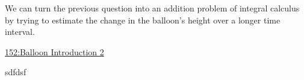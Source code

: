 \documentclass{ximera}
\begin{document}
We can turn the previous question into an addition problem of integral calculus by trying to estimate the change in the balloon's height over a longer time interval.

\begin{example} \label{ExLKDrDEfRE9}

\begin{onlineOnly}
    \begin{center}
\end{center}
\end{onlineOnly}

\href{https://www.desmos.com/calculator/h6cworakdw}{152:Balloon Introduction 2}

\end{example} 

sdfdsf
\end{document}
